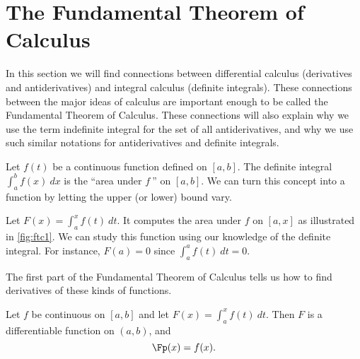 \section{The Fundamental Theorem of Calculus}\label{sec:FTC}

In this section we will find connections between differential calculus (derivatives and antiderivatives) and integral calculus (definite integrals). These connections between the major ideas of calculus are important enough to be called the Fundamental Theorem of Calculus. These connections will also explain why we use the term indefinite integral for the set of all antiderivatives, and why we use such similar notations for antiderivatives and definite integrals.

Let $f(t)$ be a continuous function defined on $[a,b]$. The definite integral $\int_a^b f(x)\ dx$ is the ``area under $f\ $'' on $[a,b]$. We can turn this concept into a function by letting the upper (or lower) bound vary.

Let $F(x) = \int_a^x f(t)\ dt$. It computes the area under $f$ on $[a,x]$ as illustrated in \autoref{fig:ftc1}. We can study this function using our knowledge of the definite integral. For instance, $F(a)=0$ since $\int_a^af(t)\ dt=0$. %


The first part of the Fundamental Theorem of Calculus tells us how to find derivatives of these kinds of functions.

{Let $f$ be continuous on $[a,b]$ and let $F(x) = \int_a^x f(t)\ dt$. Then $F$ is a differentiable function on $(a,b)$, and
\[\Fp(x)=f(x).\]}

